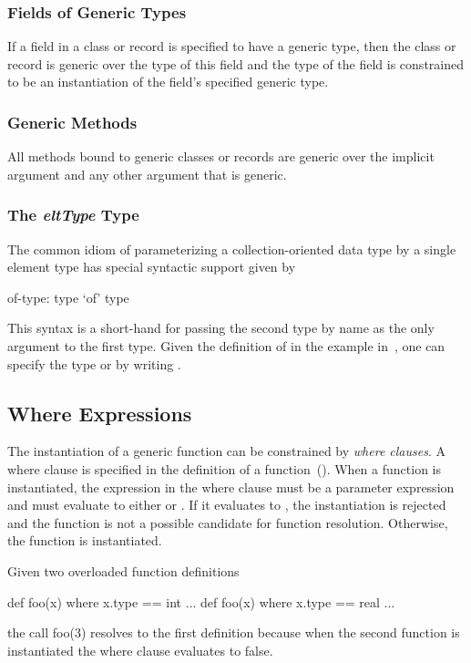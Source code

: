 \subsubsection{Fields of Generic Types}
\label{Fields_of_Generic_Types}

If a field in a class or record is specified to have a generic type,
then the class or record is generic over the type of this field and
the type of the field is constrained to be an instantiation of the
field's specified generic type.

\subsubsection{Generic Methods}
\label{Generic_Methods}

All methods bound to generic classes or records are generic over the
implicit  argument and any other argument that is generic.

\subsubsection{The {\em eltType} Type}
\label{The_eltType_Type}

The common idiom of parameterizing a collection-oriented data type by
a single element type has special syntactic support given by
\begin{syntax}
of-type:
  type `of' type
\end{syntax}
This syntax is a short-hand for passing the second type by name
 as the only argument to the first type.  Given the
definition of  in the example
in~, one can specify the type
 or  by writing .

\subsection{Where Expressions}
\label{Where_Expressions}

The instantiation of a generic function can be constrained by {\em
where clauses}.  A where clause is specified in the definition of a
function~().  When a function is
instantiated, the expression in the where clause must be a parameter
expression and must evaluate to either  or .
If it evaluates to , the instantiation is rejected and the
function is not a possible candidate for function resolution.
Otherwise, the function is instantiated.
\begin{example}
Given two overloaded function definitions
\begin{chapel}
def foo(x) where x.type == int { $\ldots$ }
def foo(x) where x.type == real { $\ldots$ }
\end{chapel}
the call foo(3) resolves to the first definition because when the
second function is instantiated the where clause evaluates to false.
\end{example}

